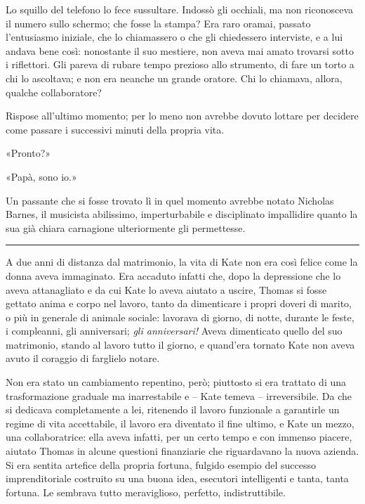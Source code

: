 \documentclass[a4paper,oneside,11pt]{memoir}
\begin{document}
Lo squillo del telefono lo fece sussultare. Indossò gli occhiali, ma non
riconosceva il numero sullo schermo; che fosse la stampa? Era raro oramai,
passato l'entusiasmo iniziale, che lo chiamassero o che gli chiedessero
interviste, e a lui andava bene così: nonostante il suo mestiere, non aveva mai
amato trovarsi sotto i riflettori. Gli pareva di rubare tempo prezioso allo
strumento, di fare un torto a chi lo ascoltava; e non era neanche un grande
oratore. Chi lo chiamava, allora, qualche collaboratore?

Rispose all'ultimo momento; per lo meno non avrebbe dovuto lottare per decidere
come passare i successivi minuti della propria vita.

«Pronto?»

«Papà, sono io.»

Un passante che si fosse trovato lì in quel momento avrebbe notato Nicholas
Barnes, il musicista abilissimo, imperturbabile e disciplinato impallidire
quanto la sua già chiara carnagione ulteriormente gli permettesse.

\plainbreak{1}

A due anni di distanza dal matrimonio, la vita di Kate non era così felice come
la donna aveva immaginato. Era accaduto infatti che, dopo la depressione che lo
aveva attanagliato e da cui Kate lo aveva aiutato a uscire, Thomas si fosse
gettato anima e corpo nel lavoro, tanto da dimenticare i propri doveri di
marito, o più in generale di animale sociale: lavorava di giorno, di notte,
durante le feste, i compleanni, gli anniversari; \emph{gli anniversari!} Aveva
dimenticato quello del suo matrimonio, stando al lavoro tutto il giorno, e
quand'era tornato Kate non aveva avuto il coraggio di farglielo notare.

Non era stato un cambiamento repentino, però; piuttosto si era trattato di una
trasformazione graduale ma inarrestabile e -- Kate temeva -- irreversibile. Da
che si dedicava completamente a lei, ritenendo il lavoro funzionale a garantirle
un regime di vita accettabile, il lavoro era diventato il fine ultimo, e Kate un
mezzo, una collaboratrice: ella aveva infatti, per un certo tempo e con immenso
piacere, aiutato Thomas in alcune questioni finanziarie che riguardavano la
nuova azienda. Si era sentita artefice della propria fortuna, fulgido esempio
del successo imprenditoriale costruito su una buona idea, esecutori intelligenti
e tanta, tanta fortuna. Le sembrava tutto meraviglioso, perfetto,
indistruttibile.
\end{document}
